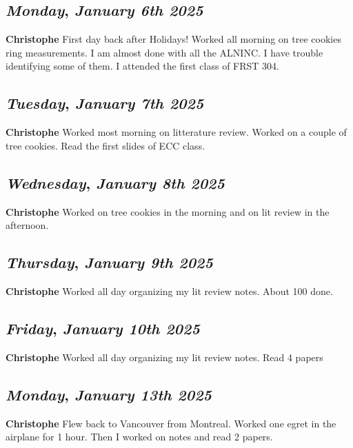 \begin{center}
\section*{\month}
\end{center}

\def\day{\textit{January 6th 2025}}
\def\weekday{\textit{Monday}}
\subsection*{\weekday, \day}
\textbf {Christophe}
First day back after Holidays!
Worked all morning on tree cookies ring measurements. I am almost done with all the ALNINC.  I have trouble identifying some of them.
I attended the first class of FRST 304. 

\def\day{\textit{January 7th 2025}}
\def\weekday{\textit{Tuesday}}
\subsection*{\weekday, \day}
\textbf {Christophe}
Worked most morning on litterature review. Worked on a couple of tree cookies. Read the first slides of ECC class. 

\def\day{\textit{January 8th 2025}}
\def\weekday{\textit{Wednesday}}
\subsection*{\weekday, \day}
\textbf {Christophe}
Worked on tree cookies in the morning and on lit review in the afternoon. 

\def\day{\textit{January 9th 2025}}
\def\weekday{\textit{Thursday}}
\subsection*{\weekday, \day}
\textbf {Christophe}
Worked all day organizing my lit review notes. About 100 done. 

\def\day{\textit{January 10th 2025}}
\def\weekday{\textit{Friday}}
\subsection*{\weekday, \day}
\textbf {Christophe}
Worked all day organizing my lit review notes. Read 4 papers

\def\day{\textit{January 13th 2025}}
\def\weekday{\textit{Monday}}
\subsection*{\weekday, \day}
\textbf {Christophe}
Flew back to Vancouver from Montreal. Worked one egret in the airplane for 1 hour. Then I worked on notes and read 2 papers. 

